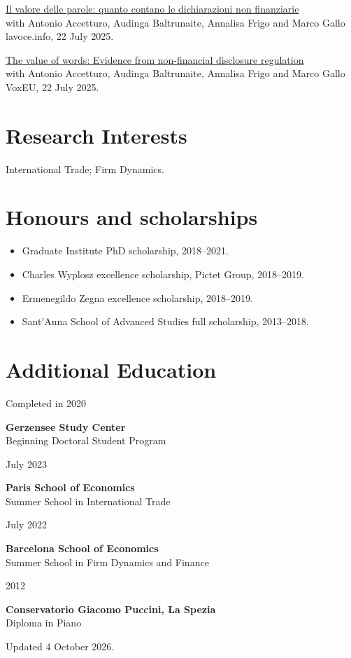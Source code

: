 \documentclass[11pt,a4paper]{article}
\newcommand{\entry}[3]{\noindent\begin{minipage}[t]{0.26\linewidth}\small #2\end{minipage}\hfill\begin{minipage}[t]{0.71\linewidth}\textbf{#1}\\#3\end{minipage}\par\medskip}
\begin{document}
\noindent\begin{minipage}{\linewidth}
\href{https://lavoce.info/archives/108464/il-valore-delle-parole-quanto-contano-le-dichiarazioni-non-finanziarie/}{Il valore delle parole: quanto contano le dichiarazioni non finanziarie}\\
with Antonio Accetturo, Audinga Baltrunaite, Annalisa Frigo and Marco Gallo\\
lavoce.info, 22 July 2025.
\end{minipage}\par\medskip
\noindent\begin{minipage}{\linewidth}
\href{https://cepr.org/voxeu/columns/value-words-evidence-non-financial-disclosure-regulation}{The value of words: Evidence from non-financial disclosure regulation}\\
with Antonio Accetturo, Audinga Baltrunaite, Annalisa Frigo and Marco Gallo\\
VoxEU, 22 July 2025.
\end{minipage}\par\medskip
\section*{Research Interests}
International Trade; Firm Dynamics.

\section*{Honours and scholarships}
\begin{itemize}
\item Graduate Institute PhD scholarship, 2018--2021.
\item Charles Wyplosz excellence scholarship, Pictet Group, 2018--2019.
\item Ermenegildo Zegna excellence scholarship, 2018--2019.
\item Sant'Anna School of Advanced Studies full scholarship, 2013--2018.
\end{itemize}
\section*{Additional Education}
\entry{Gerzensee Study Center}{Completed in 2020}{Beginning Doctoral Student Program}
\entry{Paris School of Economics}{July 2023}{Summer School in International Trade}
\entry{Barcelona School of Economics}{July 2022}{Summer School in Firm Dynamics and Finance}

\entry{Conservatorio Giacomo Puccini, La Spezia}{2012}{Diploma in Piano}

\vfill
{\small Updated 4 October 2026.}
\end{document}
